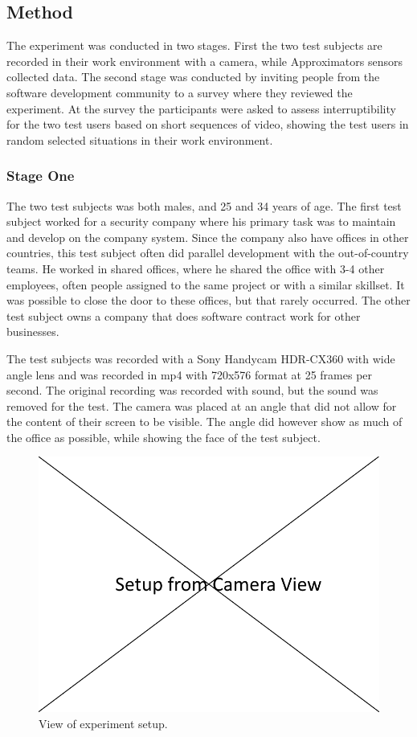 \documentclass{sigchi}
\begin{document}
\subsection{Method}
\label{method}
The experiment was conducted in two stages.
First the two test subjects are recorded in their work environment with a camera, while Approximators sensors collected data.
The second stage was conducted by inviting people from the software development community to a survey where they reviewed the experiment.
At the survey the participants were asked to assess interruptibility for the two test users based on short sequences of video, showing the test users in random selected situations in their work environment.

\subsubsection{Stage One}
The two test subjects was both males, and 25 and 34 years of age.
The first test subject worked for a security company where his primary task was to maintain and develop on the company system.
Since the company also have offices in other countries, this test subject often did parallel development with the out-of-country teams.
He worked in shared offices, where he shared the office with 3-4 other employees, often people assigned to the same project or with a similar skillset.
It was possible to close the door to these offices, but that rarely occurred.
The other test subject owns a company that does software contract work for other businesses.

The test subjects was recorded with a Sony Handycam HDR-CX360 with wide angle lens and was recorded in mp4 with 720x576 format at 25 frames per second.
The original recording was recorded with sound, but the sound was removed for the test.
The camera was placed at an angle that did not allow for the content of their screen to be visible.
The angle did however show as much of the office as possible, while showing the face of the test subject.

\begin{figure}
  \centering
  \includegraphics[width=\columnwidth]{figures/experiment_setup.png}
  \caption{View of experiment setup.}
  \label{fig:experiment}
\end{figure}
\end{document}
